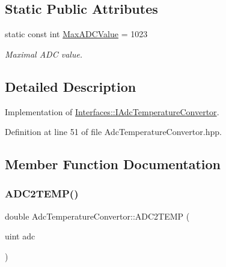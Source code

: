 \subsection*{Static Public Attributes}
\begin{DoxyCompactItemize}
\item 
\mbox{\label{class_adc_temperature_convertor_a48ae20f44ed7ab7a1f6bbfab219fc6f8}} 
static const int \hyperlink{class_adc_temperature_convertor_a48ae20f44ed7ab7a1f6bbfab219fc6f8}{Max\+A\+D\+C\+Value} = 1023
\begin{DoxyCompactList}\small\item\em Maximal A\+DC value. \end{DoxyCompactList}\end{DoxyCompactItemize}


\subsection{Detailed Description}
Implementation of \hyperlink{class_interfaces_1_1_i_adc_temperature_convertor}{Interfaces\+::\+I\+Adc\+Temperature\+Convertor}. 

Definition at line 51 of file Adc\+Temperature\+Convertor.\+hpp.



\subsection{Member Function Documentation}
\mbox{\label{class_adc_temperature_convertor_a3ee4549435400d9ed319fd5fdb83c97f}} 
\subsubsection{\texorpdfstring{A\+D\+C2\+T\+E\+M\+P()}{ADC2TEMP()}}
{\footnotesize\ttfamily double Adc\+Temperature\+Convertor\+::\+A\+D\+C2\+T\+E\+MP (\begin{DoxyParamCaption}\item[{uint}]{adc }\end{DoxyParamCaption})\hspace{0.3cm}{\ttfamily [virtual]}}



